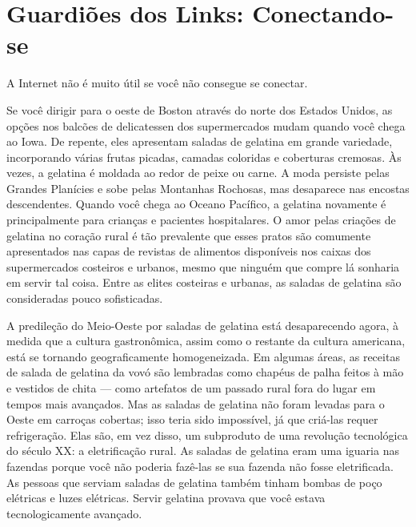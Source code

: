\section{Guardiões dos Links: Conectando-se}
\label{gatekeepers:guardioes-links}

A Internet não é muito útil se você não consegue se conectar.

Se você dirigir para o oeste de Boston através do norte dos Estados Unidos, as opções nos
balcões de delicatessen dos supermercados mudam quando você chega ao Iowa. De repente, eles
apresentam saladas de gelatina em grande variedade, incorporando várias frutas picadas, camadas
coloridas e coberturas cremosas. Às vezes, a gelatina é moldada ao redor de peixe ou carne. A
moda persiste pelas Grandes Planícies e sobe pelas Montanhas Rochosas, mas desaparece nas
encostas descendentes. Quando você chega ao Oceano Pacífico, a gelatina novamente é principalmente
para crianças e pacientes hospitalares. O amor pelas criações de gelatina no coração rural é tão
prevalente que esses pratos são comumente apresentados nas capas de revistas de alimentos
disponíveis nos caixas dos supermercados costeiros e urbanos, mesmo que ninguém que compre lá
sonharia em servir tal coisa. Entre as elites costeiras e urbanas, as saladas de gelatina são
consideradas pouco sofisticadas.

A predileção do Meio-Oeste por saladas de gelatina está desaparecendo agora, à medida que a
cultura gastronômica, assim como o restante da cultura americana, está se tornando
geograficamente homogeneizada. Em algumas áreas, as receitas de salada de gelatina da vovó são
lembradas como chapéus de palha feitos à mão e vestidos de chita --- como artefatos de um
passado rural fora do lugar em tempos mais avançados. Mas as saladas de gelatina não foram
levadas para o Oeste em carroças cobertas; isso teria sido impossível, já que criá-las requer
refrigeração. Elas são, em vez disso, um subproduto de uma revolução tecnológica do século XX:
a eletrificação rural. As saladas de gelatina eram uma iguaria nas fazendas porque você não
poderia fazê-las se sua fazenda não fosse eletrificada. As pessoas que serviam saladas de
gelatina também tinham bombas de poço elétricas e luzes elétricas. Servir gelatina provava que
você estava tecnologicamente avançado.

